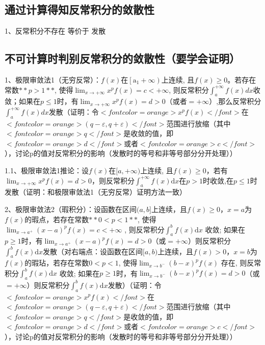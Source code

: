 \subsection{通过计算得知反常积分的敛散性}

1、反常积分不存在 等价于 发散



\subsection{不可计算时判别反常积分的敛散性（要学会证明）}

1、极限审敛法1（无穷反常）：$ f(x) $在$ \left[\mathrm{a}_{1}+\infty\right) $上连续, 且$ f(x) \geqslant 0 $。若存在常数$ **p>1** $, 使得$  \lim_{x \rightarrow+\infty} x^{p} f(x)=c<+\infty $, 则反常积分$ \int_{a}^{+\infty} f(x) d x $收敛；如果在$ p \leqslant 1 $时，有$ \lim_{x \rightarrow+\infty} x^{p} f(x)=d>0 $（或者$ =+\infty $）,那么反常积分$ \int_{a}^{+\infty} f({x}) dx $发散（证明：令$ <font color=orange>x^{p} f(x)</font> $在$ <font color=orange>(q-\varepsilon,q+\varepsilon)</font> $范围进行放缩（其中$ <font color=orange>q</font> $是收敛的值，即$ <font color=orange>d</font> $或者$ <font color=orange>c</font> $），讨论p的值对反常积分的影响（发散时的等号和非等号部分分开处理））

1.1、极限审敛法1推论：设$ f(x) $在$ [a,+\infty) $上连续, 且$ f(x) \geqslant 0 $，若有$ \lim_{x \rightarrow+\infty} x^{p} f(x)=d>0 $，则反常积分$ \int_{a}^{+\infty} f(x) \mathrm{d} x $在$ p>1 $时收敛,在$ p \leqslant 1 $时发散（证明：和极限审敛法1（无穷反常）证明方法一致）

2、极限审敛法2（瑕积分）：设函数在区间$ (a,b] $上连续，且$ f(x) \geqslant 0 $，$ x=a $为$ f(x) $的瑕点，若存在常数$ **0<p<1** $, 使得$ \lim_{x \rightarrow a^{+}}(x-a)^{p} f(x) =c<+\infty $ , 则反常积分$ \int_{a}^{b} f(x) \mathrm{d} x $ 收敛; 如果在$ p \geqslant 1 $时，有$ \lim _{x \rightarrow a^{+}}(x-a)^{p} f(x)=d>0 $（或$ =+\infty $）则反常积分$ \int_{a}^{b} f(x) \mathrm{d} x $发散（对右端点：设函数在区间$ [a,b) $上连续，且$ f(x) \gt 0 $，$ x=b $为$ f(x) $的瑕玷，若存在常数$ 0<p<1 $, 使得$ \lim_{x \rightarrow b^{-}}(b-x)^{p} f(x) $ 存在, 则反常积分$ \int_{a}^{b} f(x) \mathrm{d} x $ 收敛; 如果在$ p \geqslant 1 $时，有$ \lim _{x \rightarrow b^{-}}(b-x)^{p} f(x)=d>0 $（或$ =+\infty $）则反常积分$ \int_{a}^{b} f(x) \mathrm{d} x $发散）（证明：令$ <font color=orange>x^{p} f(x)</font> $在$ <font color=orange>(q-\varepsilon,q+\varepsilon)</font> $范围进行放缩（其中$ <font color=orange>q</font> $是收敛的值，即$ <font color=orange>d</font> $或者$ <font color=orange>c</font> $），讨论p的值对反常积分的影响（发散时的等号和非等号部分分开处理））

